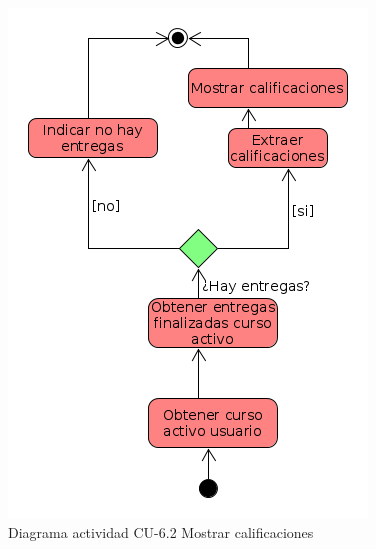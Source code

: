         \begin{figure}[H] %
\centering
\includegraphics[scale=0.4]{imagenes/diagramas/actividad/mostrar_calificaciones.png}  %

\caption{Diagrama actividad CU-6.2 Mostrar calificaciones}\label{figura152}
\end{figure}



    